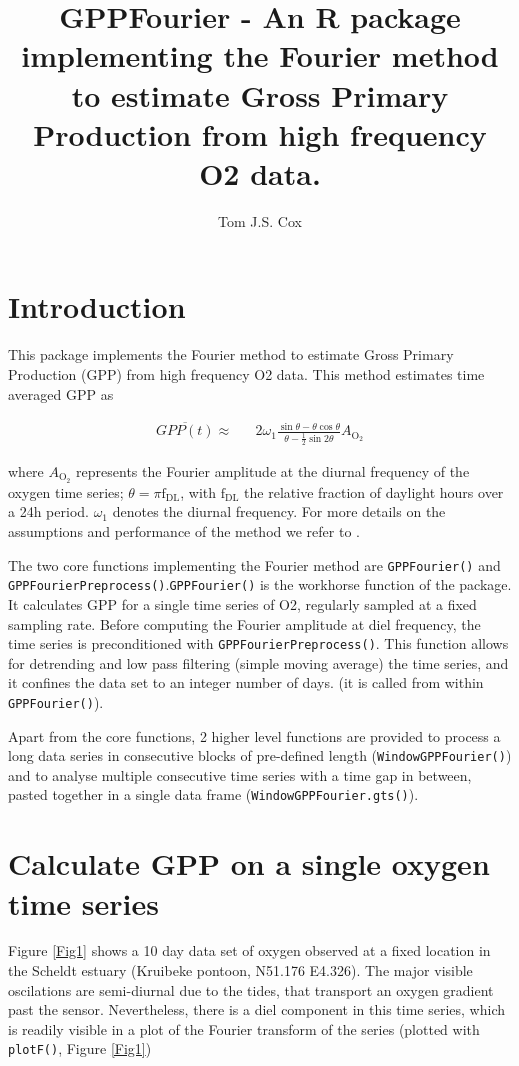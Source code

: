 \documentclass[10pt,a4wide]{article}
\author{Tom J.S. Cox}
\title{GPPFourier - An R package implementing the Fourier method to estimate Gross Primary Production from high frequency O2 data.}
\newcommand{\Ox}{\mathrm{O_2}}
\begin{document}



\maketitle
\section{Introduction}

This package implements the Fourier method to estimate Gross Primary Production (GPP) from high frequency O2 data. This method estimates time averaged GPP as

\begin{eqnarray}
\overline{GPP(t)} \approx && 2 \omega_1 \frac{\sin \theta - \theta
\cos \theta}{\theta - \frac{1}{2}\sin 2\theta} A_{\Ox} \label{eq:final2}
\end{eqnarray}

where $A_{\Ox}$ represents the Fourier amplitude at the diurnal frequency of the oxygen time series; $\theta = \pi \mathrm{f_{DL}}$, with $\mathrm{f_{DL}}$ the relative fraction of daylight hours over a 24h period. $\omega_1$ denotes the diurnal frequency. For more details on the assumptions and performance of the method we refer to \citep{Cox2015b}.

The two core functions implementing the Fourier method are \texttt{GPPFourier()} and \texttt{GPPFourierPreprocess()}.\texttt{GPPFourier()} is the workhorse function of the package. It calculates GPP for a single time series of O2, regularly sampled at a fixed sampling rate. Before computing the Fourier amplitude at diel frequency, the time series is preconditioned with \texttt{GPPFourierPreprocess()}. This function allows for detrending and low pass filtering (simple moving average) the time series, and it confines the data set to an integer number of days. (it is called from within \texttt{GPPFourier()}).

Apart from the core functions, 2 higher level functions are provided to process a long data series in consecutive blocks of pre-defined length (\texttt{WindowGPPFourier()}) and to analyse multiple consecutive time series with a time gap in between, pasted together in a single data frame (\texttt{WindowGPPFourier.gts()}).

\section{Calculate GPP on a single oxygen time series}
Figure \ref{Fig1} shows a 10 day data set of oxygen observed at a fixed location in the Scheldt estuary (Kruibeke pontoon, N51.176 E4.326). The major visible oscilations are semi-diurnal due to the tides, that transport an oxygen gradient past the sensor. Nevertheless, there is a diel component in this time series, which is readily visible in a plot of the Fourier transform of the series (plotted with \texttt{plotF()}, Figure \ref{Fig1})
\end{document}
